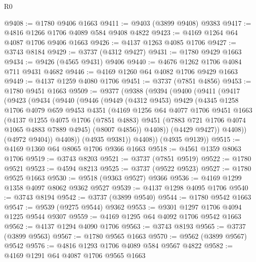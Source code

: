 \begin{lexlean}{R0}
\begin{coremodule}
@9408 := @1780 @9406 @1663
@9411 := @9403 (@3899 @9408) @9383
@9417 := @4816 @1266 @1706 @4089 @584 @9408 @4822
@9423 := @4169 @1264 @64 @4087 @1706 @9406 @1663
@9426 := @4137 @1263 @4085 @1706
@9427 := @3743 @8184
@9429 := @3737 (@4312 @9427)
@9431 := @1780 @9429 @1663
@9434 := @9426 (@4565 @9431) @9406
@9440 := @4676 @1262 @1706 @4084 @711 @9431 @4682
@9446 := @4169 @1260 @64 @4082 @1706 @9429 @1663
@9449 := @4137 @1259 @4080 @1706
@9451 := @3737 (@7851 @4856)
@9453 := @1780 @9451 @1663
@9509 := @9377
    (@9388
      (@9394
        (@9400
          (@9411
            (@9417
              (@9423
                (@9434
                  (@9440
                    (@9446
                      (@9449
                        (@4312 @9453)
                        @9429
                        (@4345
                          @1258
                          @1706
                          @4079
                          @659
                          @9453
                          @4351
                          (@4169
                            @1256
                            @64
                            @4077
                            @1706
                            @9451
                            @1663
                            (@4137
                              @1255
                              @4075
                              @1706
                              (@7851 @4883)
                              @9451
                              (@7883 @721 @1706 @4074 @1065 @4883 @7889 @4945)
                              (@8007 @4856))
                            @4408))
                        (@4429 @9427))
                      @4408))
                  (@4972 @9404))
                @4408))
            (@4935 @9381))
          @4408))
      (@4935 @9139))
@9515 := @4169 @1360 @64 @8065 @1706 @9366 @1663
@9518 := @4561 @1359 @8063 @1706
@9519 := @3743 @8203
@9521 := @3737 (@7851 @9519)
@9522 := @1780 @9521
@9523 := @4594 @8213
@9525 := @3737 (@9522 @9523)
@9527 := @1780 @9525 @1663
@9530 := @9518 (@9363 @9527) @9366
@9536 := @4169 @1299 @1358 @4097 @8062 @9362 @9527
@9539 := @4137 @1298 @4095 @1706
@9540 := @3743 @8194
@9542 := @3737 (@3899 @9540)
@9544 := @1780 @9542 @1663
@9547 := @9539 (@9275 @9544) @9362
@9553 := @9301 @1297 @1706 @4094 @1225 @9544 @9307
@9559 := @4169 @1295 @64 @4092 @1706 @9542 @1663
@9562 := @4137 @1294 @4090 @1706
@9563 := @3743 @8193
@9565 := @3737 (@3899 @9563)
@9567 := @1780 @9565 @1663
@9570 := @9562 (@3899 @9567) @9542
@9576 := @4816 @1293 @1706 @4089 @584 @9567 @4822
@9582 := @4169 @1291 @64 @4087 @1706 @9565 @1663

\end{coremodule}
\end{lexlean}
